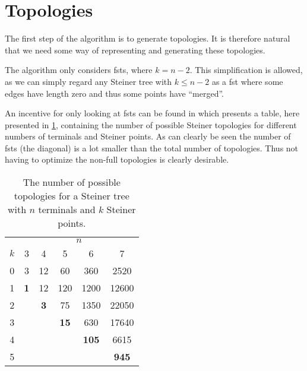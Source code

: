 \section{Topologies}
\label{sec:topologies}

The first step of the algorithm is to generate topologies. It is therefore
natural that we need some way of representing and generating these topologies.

The algorithm only considers \acp{fst}, where $k = n - 2$. This simplification
is allowed, as we can simply regard any Steiner tree with $k \le n - 2$ as a
\ac{fst} where some edges have length zero and thus some points have
``merged''.

An incentive for only looking at \acp{fst} can be found in \textcite{gilbert1968}
which presents a table, here presented in \cref{tab:number-of-topologies},
containing the number of possible Steiner topologies for different numbers of
terminals and Steiner points. As can clearly be seen the number of \acp{fst}
(the diagonal) is a lot smaller than the total number of topologies. Thus not
having to optimize the non-full topologies is clearly desirable.

\begin{table}[htbp]
  \centering
  \begin{tabular}{cccccc}
    \toprule
    & \multicolumn{5}{c}{$n$} \\
    $k$ & 3    & 4    & 5     & 6      & 7      \\
    \cmidrule(r){1-1}\cmidrule(l){2-6}
    0   & 3          & 12         & 60          & 360          & 2520         \\
    1   & \textbf{1} & 12         & 120         & 1200         & 12600        \\
    2   &            & \textbf{3} & 75          & 1350         & 22050        \\
    3   &            &            & \textbf{15} & 630          & 17640        \\
    4   &            &            &             & \textbf{105} & 6615         \\
    5   &            &            &             &              & \textbf{945} \\
    \bottomrule
  \end{tabular}
  \caption[Number of possible topologies]{The number of possible topologies for a Steiner tree with $n$
    terminals and $k$ Steiner points.\label{tab:number-of-topologies}}
\end{table}

